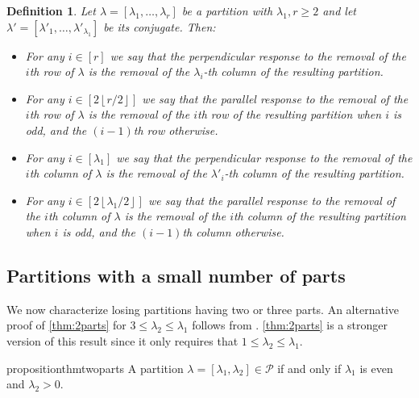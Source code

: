 \documentclass[pdflatex,sn-mathphys-num]{sn-jnl}%
\theoremstyle{thmstyleone}%
\theoremstyle{thmstyletwo}%
\theoremstyle{thmstylethree}%
\newtheorem{definition}{Definition}%
\newcommand{\p}{\mathcal P}
\begin{document}
\begin{definition}
    Let $\lambda = [\lambda_1,\dots, \lambda_r]$ be a partition with $\lambda_1,r\ge 2$ and let $\lambda' = [\lambda'_1,\dots, \lambda'_{\lambda_1}]$ be its conjugate. Then: 
    \begin{itemize}
        \item For any $i\in [r]$ we say that the \emph{perpendicular response} to the removal of the $i$th row of $\lambda$ is the removal of the $\lambda_i$-th column of the resulting partition.
        \item For any $i\in \left[2\left\lfloor r/2\right\rfloor \right]$ we say that the \emph{parallel response} to the removal of the $i$th row of $\lambda$ is the removal of the $i$th row of the resulting partition when $i$ is odd, and the $(i-1)$th row otherwise.
        \item For any $i\in [\lambda_1]$ we say that the \emph{perpendicular response} to the removal of the $i$th column of $\lambda$ is the removal of the $\lambda'_i$-th column of the resulting partition.
        \item For any $i\in \left[2\left\lfloor \lambda_1/2\right\rfloor \right]$ we say that the \emph{parallel response} to the removal of the $i$th column of $\lambda$ is the removal of the $i$th column of the resulting partition when $i$ is odd, and the $(i-1)$th column otherwise.
    \end{itemize}
\end{definition}


\subsection{Partitions with a small number of parts} 

We now characterize losing partitions having two or three parts. An alternative proof of \cref{thm:2parts} for $3 \leq \lambda_2 \leq \lambda_1$ follows from \cite[Lemma 3.8]{Basic_2023}. \cref{thm:2parts} is a stronger version of this result since it only requires that $1 \leq \lambda_2 \leq \lambda_1$. 

\begin{restatable}{proposition}{thmtwoparts} \label{thm:2parts}
    A partition $\lambda = [ \lambda_1, \lambda_2] \in \p$ if and only if $\lambda_1$ is even and $\lambda_2 > 0$. 
\end{restatable}
\end{document}
